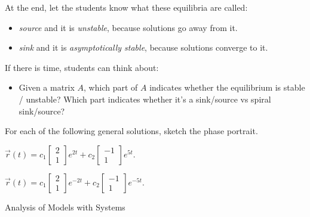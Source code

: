 \bookonlynewpage

\begin{annotation}
	\begin{goals}
	At the end, let the students know what these equilibria are called:
	\begin{itemize}
		\item \emph{source} and it is \emph{unstable}, because solutions go away from it.
		\item \emph{sink} and it is \emph{asymptotically stable}, because solutions converge to it.
	\end{itemize}
	
	If there is time, students can think about:
	\begin{itemize}
		\item Given a matrix $A$, which part of $A$ indicates whether the equilibrium is stable / unstable? Which part indicates whether it's a sink/source vs spiral sink/source?
	\end{itemize}
	\end{goals}
\end{annotation}
\question
	For each of the following general solutions, sketch the phase portrait.
\begin{parts}
	\item $	\vec{r}(t) = c_1 \begin{bmatrix} 2 \\ 1 \end{bmatrix} e^{2t} + c_2 \begin{bmatrix} -1 \\ 1 \end{bmatrix} e^{5t}.$
	\item $	\vec{r}(t) = c_1 \begin{bmatrix} 2 \\ 1 \end{bmatrix} e^{-2t} + c_2 \begin{bmatrix} -1 \\ 1 \end{bmatrix} e^{-5t}.$	
\end{parts}





\standardonlynewpage

%
%



\begin{module}{Analysis of Models with Systems}
	\label{sys:analysis}

	
	
\end{module}



